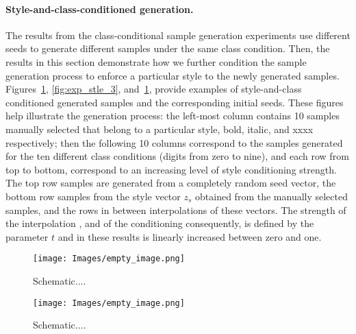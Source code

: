             \paragraph{Style-and-class-conditioned generation.} 
            The results from the class-conditional sample generation experiments use different seeds to generate different samples under the same class condition. Then, the results in this section demonstrate how we further condition the sample generation process to enforce a particular style to the newly generated samples. Figures~\ref{fig:exp_stle_1}, \ref{fig:exp_stle_3}, and~\ref{fig:exp_stle_1}, provide examples of style-and-class conditioned generated samples and the corresponding initial seeds. These figures help illustrate the generation process: the left-most column contains 10 samples manually selected that belong to a particular style, bold, italic, and xxxx respectively; then the following 10 columns correspond to the samples generated for the ten different class conditions (digits from zero to nine), and each row from top to bottom, correspond to an increasing level of style conditioning strength. The top row samples are generated from a completely random seed vector, the bottom row samples from the style vector $z_s$ obtained from the manually selected samples, and the rows in between interpolations of these vectors. The strength of the interpolation , and of the conditioning consequently, is defined by the parameter $t$ and in these results is linearly increased between zero and one. 

            \begin{figure}
                \vskip -0.2in 
                \centering
    
                \texttt{[image: Images/empty\_image.png]} 
                
                \vspace{-2pt}
                \caption{\label{fig:exp_stle_1} Schematic.... }
                \vskip -0.0in 
            \end{figure}

            \begin{figure}
                \vskip -0.2in 
                \centering
    
                \texttt{[image: Images/empty\_image.png]} 
                
                \vspace{-2pt}
                \caption{\label{fig:exp_stle_2} Schematic.... }
                \vskip -0.0in 
            \end{figure}

